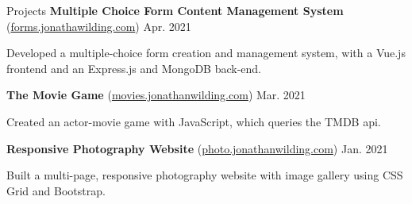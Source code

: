 \documentclass{resume} %
\begin{document}
\begin{rSection}{Projects}
    \textbf{Multiple Choice Form Content Management System}
    (\href{https://forms.jonathanwilding.com}{forms.jonathawilding.com}) \hfill{Apr. 2021}
    \begin{compactitem}
        \item Developed a multiple-choice form creation and management system, with a Vue.js
            frontend and an Express.js and MongoDB back-end.
    \end{compactitem}
    \textbf{The Movie Game} (\href{https://movies.jonathanwilding.com}{movies.jonathanwilding.com}) \hfill{Mar. 2021}
    \begin{compactitem}
        \item Created an actor-movie game with JavaScript, which queries the TMDB api.
    \end{compactitem}
    \textbf{Responsive Photography Website} (\href{https://photo.jonathanwilding.com}{photo.jonathanwilding.com}) \hfill{Jan. 2021}
    \begin{compactitem}
        \item Built a multi-page, responsive photography website with image gallery using CSS Grid and
            Bootstrap.
    \end{compactitem}
\end{rSection}
\end{document}
